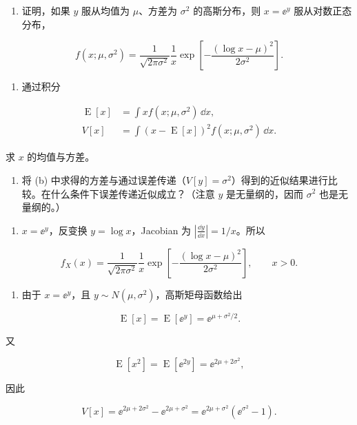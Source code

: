 \begin{question}
\begin{enumerate}
\item
  证明，如果 \(y\) 服从均值为 \(\mu\)、方差为 \(\sigma^2\)
  的高斯分布，则 \(x=\ee^y\) 服从对数正态分布，
\end{enumerate}

\[
f(x;\mu,\sigma^2)=\frac{1}{\sqrt{2\pi\sigma^2}}\frac{1}{x}\exp\left[-\frac{(\log x-\mu)^2}{2\sigma^2}\right].
\]

\begin{enumerate}[start=2]
\item
  通过积分
\end{enumerate}

\[
\begin{split}
\operatorname{E}[x]&=\int x f(x;\mu,\sigma^2)\,\dd{x},\\
V[x]&=\int (x-\operatorname{E}[x])^2 f(x;\mu,\sigma^2)\,\dd{x}.
\end{split}
\]

求 \(x\) 的均值与方差。

\begin{enumerate}[start=3]
\item
  将 (b)
  中求得的方差与通过误差传递（\(V[y]=\sigma^2\)）得到的近似结果进行比较。在什么条件下误差传递近似成立？（注意
  \(y\) 是无量纲的，因而 \(\sigma^2\) 也是无量纲的。）
\end{enumerate}
\begin{solution}
\begin{enumerate}
\item
  \(x=\ee^y\)，反变换 \(y=\log x\)，Jacobian 为 \(\left|\frac{\dd y}{\dd x}\right|=1/x\)。所以
\end{enumerate}

\[
f_X(x)=\frac{1}{\sqrt{2\pi\sigma^2}}\frac1x
\exp\left[-\frac{(\log x-\mu)^2}{2\sigma^2}\right],\qquad x>0.
\]

\begin{enumerate}[start=2]
\item
  由于 \(x=\ee^y\)，且 \(y\sim N(\mu,\sigma^2)\)，高斯矩母函数给出
\end{enumerate}

\[
\operatorname{E}[x]=\operatorname{E}[\ee^y]=\ee^{\mu+\sigma^2/2}.
\]

又

\[
\operatorname{E}[x^2]=\operatorname{E}[\ee^{2y}]=\ee^{2\mu+2\sigma^2},
\]

因此

\[
V[x]=\ee^{2\mu+2\sigma^2}-\ee^{2\mu+\sigma^2}
=\ee^{2\mu+\sigma^2}(\ee^{\sigma^2}-1).
\]


\end{solution}
\end{question}
